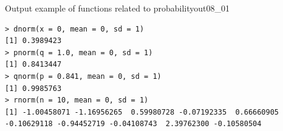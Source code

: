 \begin{Rscreen}{Output example of functions related to probability}{out08_01}
	\begin{verbatim}
> dnorm(x = 0, mean = 0, sd = 1)
[1] 0.3989423
> pnorm(q = 1.0, mean = 0, sd = 1)
[1] 0.8413447
> qnorm(p = 0.841, mean = 0, sd = 1)
[1] 0.9985763
> rnorm(n = 10, mean = 0, sd = 1)
[1] -1.00458071 -1.16956265  0.59980728 -0.07192335  0.66660905 -0.10629118 -0.94452719 -0.04108743  2.39762300 -0.10580504
\end{verbatim}
\end{Rscreen}
